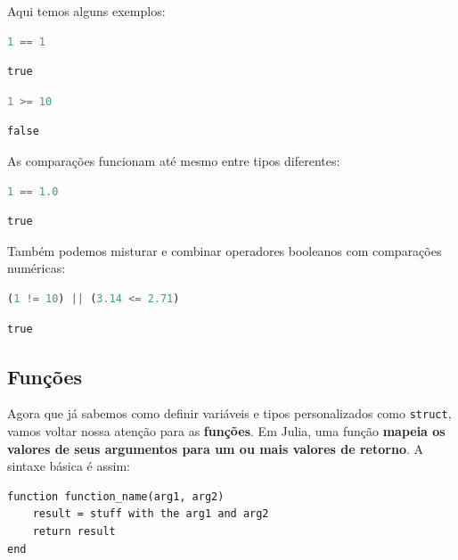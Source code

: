 \documentclass[
  notoc %
]{tufte-book}
\newcommand{\passthrough}[1]{#1}
\begin{document}
Aqui temos alguns exemplos:

\begin{lstlisting}[language=Julia]
1 == 1
\end{lstlisting}

\begin{lstlisting}[language=Output]
true
\end{lstlisting}

\begin{lstlisting}[language=Julia]
1 >= 10
\end{lstlisting}

\begin{lstlisting}[language=Output]
false
\end{lstlisting}

As comparações funcionam até mesmo entre tipos diferentes:

\begin{lstlisting}[language=Julia]
1 == 1.0
\end{lstlisting}

\begin{lstlisting}[language=Output]
true
\end{lstlisting}

Também podemos misturar e combinar operadores booleanos com comparações
numéricas:

\begin{lstlisting}[language=Julia]
(1 != 10) || (3.14 <= 2.71)
\end{lstlisting}

\begin{lstlisting}[language=Output]
true
\end{lstlisting}

\hypertarget{sec:function}{%
\subsection{Funções}\label{sec:function}}

Agora que já sabemos como definir variáveis e tipos personalizados como
\passthrough{\lstinline!struct!}, vamos voltar nossa atenção para as
\textbf{funções}. Em Julia, uma função \textbf{mapeia os valores de seus
argumentos para um ou mais valores de retorno}. A sintaxe básica é
assim:

\begin{lstlisting}
function function_name(arg1, arg2)
    result = stuff with the arg1 and arg2
    return result
end
\end{lstlisting}
\end{document}
